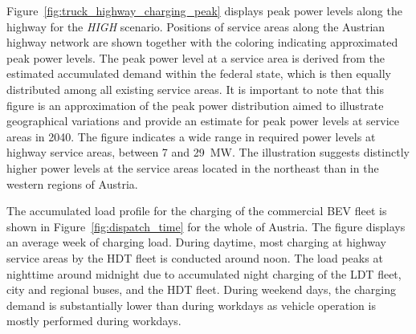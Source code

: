         Figure~\ref{fig:truck_highway_charging_peak} displays peak power levels along the highway for the \textit{HIGH} scenario. Positions of service areas along the Austrian highway network are shown together with the coloring indicating approximated peak power levels. The peak power level at a service area is derived from the estimated accumulated demand within the federal state, which is then equally distributed among all existing service areas. It is important to note that this figure is an approximation of the peak power distribution aimed to illustrate geographical variations and provide an estimate for peak power levels at service areas in 2040. The figure indicates a wide range in required power levels at highway service areas, between 7 and 29~MW. The illustration suggests distinctly higher power levels at the service areas located in the northeast than in the western regions of Austria. 
        
        The accumulated load profile for the charging of the commercial \ac{BEV} fleet is shown in Figure~\ref{fig:dispatch_time} for the whole of Austria. The figure displays an average week of charging load. During daytime, most charging at highway service areas by the \ac{HDT} fleet is conducted around noon. The load peaks at nighttime around midnight due to accumulated night charging of the \ac{LDT} fleet, city and regional buses, and the \ac{HDT} fleet. During weekend days, the charging demand is substantially lower than during workdays as vehicle operation is mostly performed during workdays.
        
